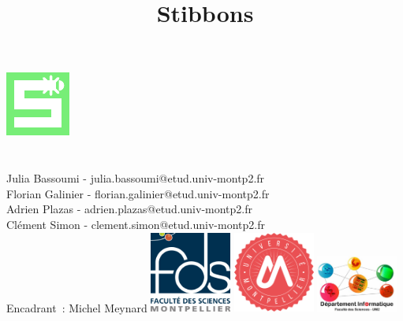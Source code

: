 \documentclass[a4paper,11pt]{report}
\begin{document}
\title{Stibbons}

\makeatletter
  \begin{titlepage}
  \centering
        \includegraphics[height=0.2\textheight]{doc/gestionProjet/stibbons.pdf}\\
        \vfill
        {\LARGE \textbf{\@title}}\\
        \vspace{1cm}
		{\large \textbf{\@date}}\\
		\vspace{1cm}
		{\large Julia Bassoumi - julia.bassoumi@etud.univ-montp2.fr\\Florian Galinier - florian.galinier@etud.univ-montp2.fr\\Adrien Plazas - adrien.plazas@etud.univ-montp2.fr\\Clément Simon - clement.simon@etud.univ-montp2.fr\\}
		\vspace{1cm}
		{\large Encadrant~: Michel Meynard}
        \vfill
        \includegraphics[width=0.2\textwidth]{doc/gestionProjet/fds.png}
        \hfill
        \includegraphics[width=0.2\textwidth]{doc/gestionProjet/UM2.png}
        \hfill
        \includegraphics[width=0.2\textwidth]{doc/gestionProjet/depinfo.jpeg}
  \end{titlepage}
\makeatother

\tableofcontents
\end{document}
